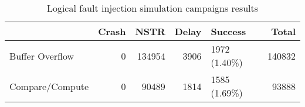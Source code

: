\begin{table}[H]
\centering
\caption{Logical fault injection simulation campaigns results}
\label{table:end_sim_by_status_hamming_multi_bitflip_reg_multi}
\begin{tabular}{lrrrlr}
\toprule
 & Crash & NSTR & Delay & Success & Total \\
\midrule
Buffer Overflow & 0 & 134954 & 3906 & 1972 (1.40\%) & 140832 \\
Compare/Compute & 0 & 90489 & 1814 & 1585 (1.69\%) & 93888 \\
\bottomrule
\end{tabular}
\end{table}
